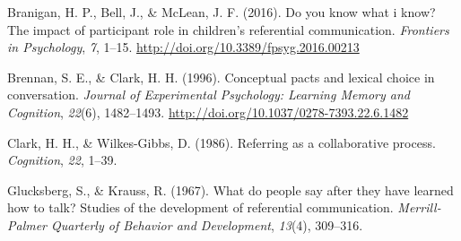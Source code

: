 \documentclass[10pt, letterpaper]{article}
\begin{document}
\setlength{\parindent}{-0.1in} 
\setlength{\leftskip}{0.125in}

\noindent

\hypertarget{refs}{}
\leavevmode\hypertarget{ref-Branigan2016Do}{}%
Branigan, H. P., Bell, J., \& McLean, J. F. (2016). Do you know what i
know? The impact of participant role in children's referential
communication. \emph{Frontiers in Psychology}, \emph{7}, 1--15.
\url{http://doi.org/10.3389/fpsyg.2016.00213}

\leavevmode\hypertarget{ref-Brennan1996Conceptual}{}%
Brennan, S. E., \& Clark, H. H. (1996). Conceptual pacts and lexical
choice in conversation. \emph{Journal of Experimental Psychology:
Learning Memory and Cognition}, \emph{22}(6), 1482--1493.
\url{http://doi.org/10.1037/0278-7393.22.6.1482}

\leavevmode\hypertarget{ref-Clark1986Referring}{}%
Clark, H. H., \& Wilkes-Gibbs, D. (1986). Referring as a collaborative
process. \emph{Cognition}, \emph{22}, 1--39.

\leavevmode\hypertarget{ref-Glucksberg1967What}{}%
Glucksberg, S., \& Krauss, R. (1967). What do people say after they have
learned how to talk? Studies of the development of referential
communication. \emph{Merrill-Palmer Quarterly of Behavior and
Development}, \emph{13}(4), 309--316.


\end{document}
